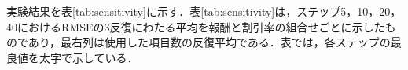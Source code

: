 \documentclass[paper]{ieicej}
\begin{document}
実験結果を表\ref{tab:sensitivity}に示す．表\ref{tab:sensitivity}は，ステップ5，10，20，40におけるRMSEの3反復にわたる平均を報酬と割引率の組合せごとに示したものであり，最右列は使用した項目数の反復平均である．表では，各ステップの最良値を太字で示している．
\end{document}

